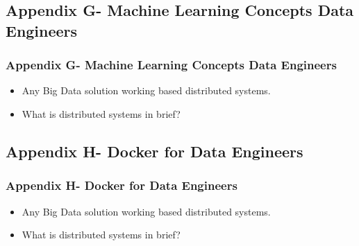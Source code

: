 
\subsection{Appendix G- Machine Learning Concepts Data Engineers}
\begin{frame}
\frametitle{Appendix G- Machine Learning Concepts Data Engineers}
\begin{itemize}[<+->]
	\item Any Big Data solution working based distributed systems.
	\item What is distributed systems in brief?
\end{itemize}
\end{frame}


\subsection{Appendix H- Docker for Data Engineers}
\begin{frame}
\frametitle{Appendix H- Docker for Data Engineers}
\begin{itemize}[<+->]
	\item Any Big Data solution working based distributed systems.
	\item What is distributed systems in brief?
\end{itemize}
\end{frame}




